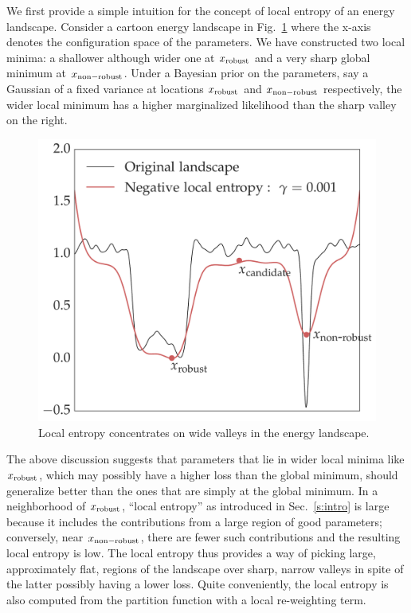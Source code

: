 \documentclass[10pt]{article}
\begin{document}
We first provide a simple intuition for the concept of local entropy of an energy landscape. Consider a cartoon energy landscape in Fig.~\ref{fig:entropyfig} where the x-axis denotes the configuration space of the parameters. We have constructed two local minima: a shallower although wider one at $x_{\mathrm{robust}}$ and a very sharp global minimum at $x_{\mathrm{non-robust}}$. Under a Bayesian prior on the parameters, say a Gaussian of a fixed variance at locations $x_{\mathrm{robust}}$ and $x_{\mathrm{non-robust}}$ respectively, the wider local minimum has a higher marginalized likelihood than the sharp valley on the right.

\begin{figure}
\centering
\includegraphics[width=0.4 \textwidth]{entropyfig.pdf}
\caption{\small Local entropy concentrates on wide valleys in the energy landscape.}
\label{fig:entropyfig}
\vspace*{-0.1in}
\end{figure}

The above discussion suggests that parameters that lie in wider local minima like $x_{\mathrm{robust}}$, which may possibly have a higher loss than the global minimum, should generalize better than the ones that are simply at the global minimum. In a neighborhood of $x_{\mathrm{robust}}$, ``local entropy'' as introduced in Sec.~\ref{s:intro} is large because it includes the contributions from a large region of good parameters; conversely, near $x_{\mathrm{non-robust}}$, there are fewer such contributions and the resulting local entropy is low. The local entropy thus provides a way of picking large, approximately flat, regions of the landscape over sharp, narrow valleys in spite of the latter possibly having a lower loss. Quite conveniently, the local entropy is also computed from the partition function with a local re-weighting term.
\end{document}
